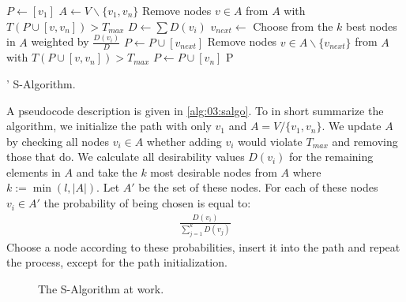 \begin{algorithm}
	\begin{algorithmic}[lines]
		\State $P \leftarrow [v_1]$
		\State $A \leftarrow V \backslash \{v_1, v_n\}$ 
		\State Remove nodes $v \in A$ from $A$ with $T(P \cup [v, v_n]) > T_{max}$
		\State $D \leftarrow \sum D(v_i)$
		\State $v_{next} \leftarrow$ Choose from the $k$ best nodes in $A$ weighted by $\frac{D(v_i)}{D}$
		\State $P \leftarrow P \cup [v_{next}]$
		\State Remove nodes $v \in A \backslash \{v_{next}\}$ from $A$ with $T(P \cup [v, v_n]) > T_{max}$
		\EndWhile
		\State $P \leftarrow P \cup [v_n]$
		\State \Return P
		\EndFunction
	\end{algorithmic}
	\caption{\citeauthor{tsiligiridis_heuristic_1984}' S-Algorithm.}
	\label{alg:03:salgo}
\end{algorithm}

A pseudocode description is given in \cref{alg:03:salgo}.
To in short summarize the algorithm, we initialize the path with only $v_1$ and $A = V / \{v_1, v_n\}$.
We update $A$ by checking all nodes $v_i \in A$ whether adding $v_i$ would violate $T_{max}$ and removing those that do.
We calculate all desirability values $D(v_i)$ for the remaining elements in $A$ and take the $k$ most desirable nodes from $A$ where $k := \min(l, |A|)$. Let $A'$ be the set of these nodes.
For each of these nodes $v_i \in A'$ the probability of being chosen is equal to:
\begin{align*}
	\frac{D(v_i)}{\sum_{j=1}^k D(v_j)}
\end{align*}
Choose a node according to these probabilities, insert it into the path and repeat the process, except for the path initialization.

\begin{wrapfigure}{r}{5cm}
	\centering
	\caption{The S-Algorithm at work.}
	\label{fig:03:salgoexample}
\end{wrapfigure}

